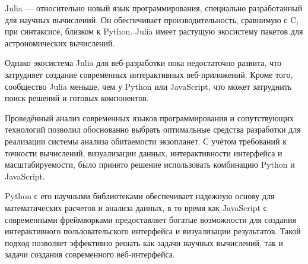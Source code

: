 Julia — относительно новый язык программирования, специально разработанный для научных вычислений. Он обеспечивает производительность, сравнимую с C, при синтаксисе, близком к Python. Julia имеет растущую экосистему пакетов для астрономических вычислений.

Однако экосистема Julia для веб-разработки пока недостаточно развита, что затрудняет создание современных интерактивных веб-приложений. Кроме того, сообщество Julia меньше, чем у Python или JavaScript, что может затруднить поиск решений и готовых компонентов.

Проведённый анализ современных языков программирования и сопутствующих технологий позволил обоснованно выбрать оптимальные средства разработки для реализации системы анализа обитаемости экзопланет. С учётом требований к точности вычислений, визуализации данных, интерактивности интерфейса и масштабируемости, было принято решение использовать комбинацию Python и JavaScript.

Python с его научными библиотеками обеспечивает надежную основу для математических расчетов и анализа данных, в то время как JavaScript с современными фреймворками предоставляет богатые возможности для создания интерактивного пользовательского интерфейса и визуализации результатов. Такой подход позволяет эффективно решать как задачи научных вычислений, так и задачи создания современного веб-интерфейса. 
